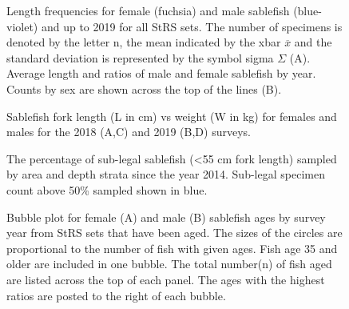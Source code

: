 \documentclass[12pt]{article}\usepackage[]{graphicx}\usepackage[]{color}
\begin{document}
\begin{figure}[htb]

{\centering {} 

}

\caption{Length frequencies for female (fuchsia) and male sablefish (blue-violet) and up to 2019 for all StRS sets. The number of specimens is denoted by the letter n, the mean indicated by the xbar \(\overline{x}\) and the standard deviation is represented by the symbol sigma \(\Sigma\) (A). Average length and ratios of male and female sablefish by year. Counts by sex are shown across the top of the lines (B).}\label{fig:figure10}
\end{figure}
\clearpage


\begin{figure}[htb]

{\centering {} 

}

\caption{Sablefish fork length (L in cm) vs weight (W in kg) for females and males for the 2018 (A,C) and 2019 (B,D) surveys.}\label{fig:figure11}
\end{figure}
\clearpage


\begin{figure}[htb]

{\centering {} 

}

\caption{The percentage of sub-legal sablefish (\textless55 cm fork length) sampled by area and depth strata since the year 2014. Sub-legal specimen count above 50\% sampled shown in blue.}\label{fig:figure12}
\end{figure}
\clearpage


\begin{figure}[htb]

{\centering {} 

}

\caption{Bubble plot for female (A) and male (B) sablefish ages by survey year from StRS sets that have been aged. The sizes of the circles are proportional to the number of fish with given ages. Fish age 35 and older are included in one bubble. The total number(n) of fish aged are listed across the top of each panel. The ages with the highest ratios are posted to the right of each bubble.}\label{fig:figure13}
\end{figure}
\clearpage
\end{document}
